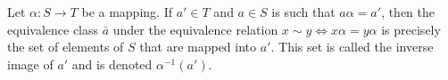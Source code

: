 Let $\alpha : S \to T$ be a mapping. If $a' \in T$ and $a \in S$ is such that $a\alpha = a'$, then the equivalence class $\bar{a}$ under the equivalence relation $x \sim y \iff x\alpha = y\alpha$ is precisely the set of elements of $S$ that are mapped into $a'$. This set is called the inverse image of $a'$ and is denoted $\alpha^{-1}(a')$.
